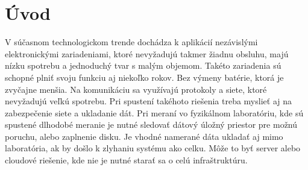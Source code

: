\documentclass[./main.tex]{subfiles} %
\begin{document}
\newpage

\section*{Úvod}
 
V súčasnom technologickom trende dochádza k aplikácií nezávislými elektronickými zariadeniami, ktoré nevyžadujú takmer žiadnu obsluhu, majú nízku spotrebu a jednoduchý tvar s malým objemom.
 Takéto zariadenia sú schopné plniť svoju funkciu aj niekoľko rokov. Bez výmeny batérie, ktorá je zvyčajne menšia. Na komunikáciu sa využívajú protokoly a siete, ktoré nevyžadujú veľkú spotrebu. Pri spustení takéhoto riešenia treba myslieť aj na zabezpečenie siete a ukladanie dát. Pri meraní vo fyzikálnom laboratóriu, kde sú spustené dlhodobé meranie je nutné sledovať dátový úložný priestor pre možnú poruchu, alebo zaplnenie disku. Je vhodné namerané dáta ukladať aj mimo laboratória, ak by došlo k zlyhaniu systému ako celku. Môže to byť server alebo cloudové riešenie, kde nie je nutné starať sa o celú infraštruktúru.
% 
\end{document}
